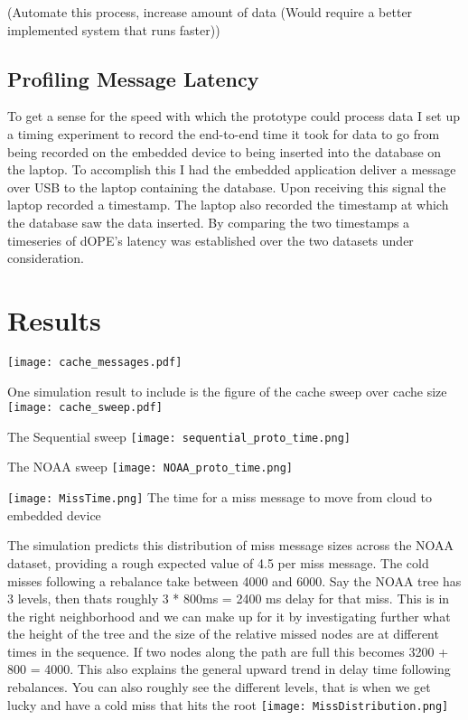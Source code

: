 \documentclass[12pt]{article}
\begin{document}
(Automate this process, increase amount of data (Would require a better implemented system that runs faster))
\subsection{Profiling Message Latency}
To get a sense for the speed with which the prototype could process data I set up a timing experiment to record the end-to-end time it took for data to go from being recorded on the embedded device to being inserted into the database on the laptop.  To accomplish this I had the embedded application deliver a message over USB to the laptop containing the database.  Upon receiving this signal the laptop recorded a timestamp.  The laptop also recorded the timestamp at which the database saw the data inserted.  By comparing the two timestamps a timeseries of dOPE's latency was established over the two datasets under consideration.

\section{Results}

\texttt{[image: cache\_messages.pdf]}

One simulation result to include is the figure of the cache sweep over cache size
\texttt{[image: cache\_sweep.pdf]}


The Sequential sweep
\texttt{[image: sequential\_proto\_time.png]}

The NOAA sweep
\texttt{[image: NOAA\_proto\_time.png]}

\texttt{[image: MissTime.png]}
The time for a miss message to move from cloud to embedded device

The simulation predicts this distribution of miss message sizes across the NOAA dataset, providing a rough expected value of 4.5 per miss message.  The cold misses following a rebalance take between 4000 and 6000.  Say the NOAA tree has 3 levels,  then thats roughly 3 * 800ms = 2400 ms delay for that miss.  This is in the right neighborhood and we can make up for it by investigating further what the height of the tree and the size of the relative missed nodes are at different times in the sequence.  If two nodes along the path are full this becomes 3200 + 800 = 4000. This also explains the general upward trend in delay time following rebalances.  You can also roughly see the different levels, that is when we get lucky and have a cold miss that hits the root 
\texttt{[image: MissDistribution.png]}
\end{document}
